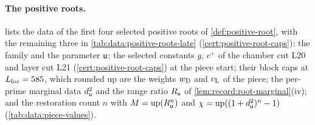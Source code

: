 {
}

\paragraph{The positive roots.}
 lists the data of the first four selected positive roots of
\cref{def:positive-root}, with the remaining three in \cref{tab:data:positive-roots-late} (\cref{cert:positive-root-caps}): the family and the
parameter $\mathsf u$; the selected constants $g$, $c^+$ of the chamber cut L20
and layer cut L21 (\cref{cert:positive-root-caps}) at the piece start; their block caps at $L_{\rm loc}=585$, which rounded up are the
weights $w_{\rm D}$ and $v_{\rm L}$ of the piece; the per-prime marginal data
$d_\mathsf u^2$ and the range ratio $R_\mathsf u$ of \cref{lem:record:root-marginal}(iv);
and the restoration count $n$ with $M=\operatorname{up}(R_\mathsf u^n)$ and
$\chi=\operatorname{up}((1+d_\mathsf u^2)^n-1)$ (\cref{tab:data:piece-values}).

